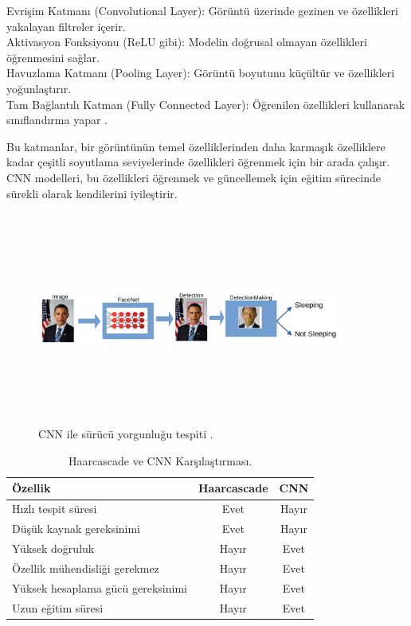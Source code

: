 \documentclass[12pt, a4paper]{article}
\begin{document}
	Evrişim Katmanı (Convolutional Layer): Görüntü üzerinde gezinen ve özellikleri yakalayan filtreler içerir.\\
	Aktivasyon Fonksiyonu (ReLU gibi): Modelin doğrusal olmayan özellikleri öğrenmesini sağlar.\\
	Havuzlama Katmanı (Pooling Layer): Görüntü boyutunu küçültür ve özellikleri yoğunlaştırır.\\
	Tam Bağlantılı Katman (Fully Connected Layer): Öğrenilen özellikleri kullanarak sınıflandırma yapar \cite{cnnnedirtek}.\par
	Bu katmanlar, bir görüntünün temel özelliklerinden daha karmaşık özelliklere kadar çeşitli soyutlama seviyelerinde özellikleri öğrenmek için bir arada çalışır. CNN modelleri, bu özellikleri öğrenmek ve güncellemek için eğitim sürecinde sürekli olarak kendilerini iyileştirir.\newpage
	\begin{figure}
		\centering
		\includegraphics[width=10cm, height=7cm, keepaspectratio]{process.png}
		\caption{CNN ile sürücü yorgunluğu tespiti \cite{eadali}.}
	\end{figure} 
	\begin{table}[h!]
		\begin{center}
			\caption{Haarcascade ve CNN Karşılaştırması.}
			\label{tab:table1}
			\begin{tabular}{l|c|c|}
				\textbf{Özellik} & \textbf{Haarcascade} & \textbf{CNN}\\
				\hline
				Hızlı tespit süresi & Evet & Hayır\\
				Düşük kaynak gereksinimi & Evet & Hayır\\
				Yüksek doğruluk & Hayır & Evet\\
				Özellik mühendisliği gerekmez & Hayır & Evet\\
				Yüksek hesaplama gücü gereksinimi & Hayır & Evet\\
				Uzun eğitim süresi & Hayır & Evet\\
			\end{tabular}
		\end{center}
	\end{table}
\end{document}
